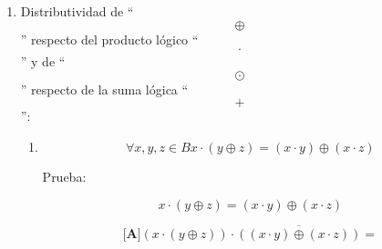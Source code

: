 \begin{enumerate}
\begin{enumerate}
\begin{enumerate}
\begin{enumerate}
        \[{= {({{({\overline{a} + b})} \cdot {({a + \overline{b}})}})}} \odot {c =}\]

        \[{= {{({\overline{({{({\overline{a}+b})}\cdot{({a+\overline{b}})}})} + c})} \cdot {({{({{({\overline{a} + b})} \cdot {({a + \overline{b}})}})} + \overline{c}})}}} =\]

        \[{= {{({\overline{({{({\overline{a}+b})}\cdot{({a+\overline{b}})}})} + c})} \cdot {({{({{({\overline{a} + b})} \cdot {({a + \overline{b}})}})} + \overline{c}})}}} =\]

        \[{= {{{({{({\overline{({\overline{a}+b})} + \overline{({a+\overline{b}})}})} + c})} \cdot {({{\overline{a} + b} + \overline{c}})}} \cdot {({{a + \overline{b}} + \overline{c}})}}} =\]

        \[{= {{{({{({{({a \cdot \overline{b}})} + {({\overline{a} \cdot b})}})} + c})} \cdot {({{\overline{a} + b} + \overline{c}})}} \cdot {({{a + \overline{b}} + \overline{c}})}}} =\]

        \[{= {{{{({{a \cdot b} \cdot c})} + {({{\overline{a} \cdot \overline{b}} \cdot c})}} + {({{\overline{a} \cdot b} \cdot \overline{c}})}} + {({{a \cdot \overline{b}} \cdot \overline{c}})}}} =\]

        \[{= {{({a \cdot {({{({b \cdot c})} + {({\overline{b} \cdot \overline{c}})}})}})} + {({\overline{a} \cdot {({{({\overline{b} \cdot c})} + {({b + \overline{c}})}})}})}}} =\]

        \[{= {{({a + {({b \oplus c})}})} \cdot {({\overline{a} + {({b \odot c})}})}}} =\]

        \[{= {{({a \cdot \overline{({b\oplus c})}})} + {({\overline{a} \cdot {({b \oplus c})}})}}} =\]

        \[{= a} \odot {({b \odot c})}\]
      \end{enumerate}
    \item
      Distributividad de ``\[\oplus\]'' respecto del producto lógico
      ``\[\cdot\]'' y de ``\[\odot\]'' res\-pecto de la suma lógica
      ``\[+\]'':

      \begin{enumerate}
      \def\labelenumiv{\arabic{enumiv}.}
      \item
        \[\forall x,y,{z \in B}{{x \cdot {({y \oplus z})}} = {({x \cdot y})}} \oplus {({x \cdot z})}\]

        Prueba:

        \[{{x \cdot {({y \oplus z})}} = {({x \cdot y})}} \oplus {({x \cdot z})}\]

        \[{\lbrack\mathbf{A}\rbrack}{{{({x \cdot {({y \oplus z})}})} \cdot \overline{({{({x\cdot y})}\oplus{({x\cdot z})}})}} =}\]


\end{enumerate}
\end{enumerate}
\end{enumerate}
\end{enumerate}
